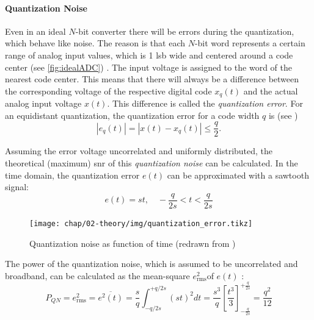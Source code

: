 \paragraph{Quantization Noise}\label{par:quant_noise}
Even in an ideal $N$-bit converter there will be errors during the quantization, which behave like noise.
The reason is that each $N$-bit word represents a certain range of analog input values, which is 1 \gls{lsb} wide and centered around a code center (see \autoref{fig:idealADC}) \cite{Lundberg}.
The input voltage is assigned to the word of the nearest code center.
This means that there will always be a difference between the corresponding voltage of the respective digital code $x_q(t)$ and the actual analog input voltage  $x(t)$.
This difference is called the \textit{quantization error}. For an equidistant quantization, the quantization error for a code width $q$ is (see \cite{puente2015})
\begin{equation}
\left| e_q(t) \right| = \left| x(t) - x_q(t) \right| \leq \frac{q}{2}.
\end{equation}

Assuming the error voltage uncorrelated and uniformly distributed, the theoretical (maximum) \gls{snr} of this \textit{quantization noise} can be calculated. In the time domain, the quantization error $e(t)$ can be approximated with a sawtooth signal: %
\begin{equation}
e(t) = st, \quad -\frac{q}{2s} < t < \frac{q}{2s} 
\end{equation}
\begin{figure}[tbh]
	\centering
	\texttt{[image: chap/02-theory/img/quantization\_error.tikz]}
	\caption{Quantization noise as function of time (redrawn from \cite{walt})}
	\label{fig:eq}
\end{figure}

The power of the quantization noise, which is assumed to be uncorrelated and broadband, can be calculated as the mean-square $e_{\text{rms}}^2$of $e(t)$ \cite{walt}:
\begin{equation}
P_{QN} = e_{\text{rms}}^{2} = \overline{e^{2}(t)} = \frac{s}{q}\int_{-q/2s}^{+q/2s} (st)^{2} dt = \frac{s^3}{q} \left[ \frac{t^3}{3}\right]_{-\frac{q}{2s}}^{+\frac{q}{2s}} = \frac{q^2}{12}
\end{equation}


